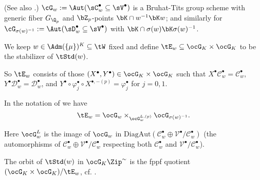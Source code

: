 \documentclass[a4paper]{scrartcl} %
\numberwithin{equation}{section}
\begin{document}
\begin{DefinitionRemark} \textnormal{(See also \cite[Lemma~3.3.2]{SYZnew}.)}
  $\cG_w:=\Aut(\sC_w^\bullet\subseteq \sV^\bullet)$ is a Bruhat-Tits group scheme with generic fiber $G_{\Q_p}$ and $\bZ_p$-points $\bK\cap w^{-1}\bK w$; and similarly for $\cG_{\sigma(w)^{-1}}:=\Aut(\sD_w^\bullet\subseteq \sV^\bullet)$ with $\bK\cap \sigma(w)\bK\sigma(w)^{-1}$.
\end{DefinitionRemark}


\begin{Definition}
  We keep $w\in \Adm(\{\mu\})^K\subseteq\tW$ fixed and define $\tE_w\subseteq\ocG_K\times\ocG_K$ to be the stabilizer of $\tStd(w)$.

  So $\tE_w$ consists of those $(X^\bullet,Y^\bullet)\in\ocG_K\times\ocG_K$ such that $X^\bullet\mathcal{C}_w^\bullet=\mathcal{C}_w^\bullet$, $Y^\bullet\mathcal{D}_w^\bullet=\mathcal{D}_w^\bullet$, and $Y^\bullet\circ\varphi_j^\bullet\circ X^{\bullet,-(p)}=\varphi_j^\bullet$ for $j=0,1$.

  In the notation of \cite[Lemma~3.3.2]{SYZnew} we have
  \begin{equation}\label{eq:verallg-zip-gp}
    \tE_w=\ocG_w\times_{\ocG_w^{L,(p)}}\ocG_{\sigma(w)^{-1}}.
  \end{equation}

  Here $\ocG_w^{L}$ is the image of $\ocG_w$ in $\mathrm{DiagAut}(\mathcal{C}_w^\bullet\oplus \mathcal{V}^\bullet/\mathcal{C}_w^\bullet)$ (the automorphisms of $\mathcal{C}_w^\bullet\oplus \mathcal{V}^\bullet/\mathcal{C}_w^\bullet$ respecting both $\mathcal{C}_w^\bullet$ and $\mathcal{V}^\bullet/\mathcal{C}_w^\bullet$).

  The orbit of $\tStd(w)$ in $\ocG_K\Zip^{\sim}$ is the fppf quotient $(\ocG_K\times\ocG_K)/\tE_w$, cf. \cite[\nopp II, \S\,5, no.~3]{DGen}.
\end{Definition}
\end{document}
